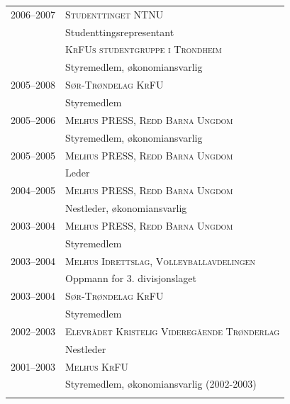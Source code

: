 \documentclass[a4paper,10pt]{article}
\begin{document}
\begin{longtable}{r|p{11cm}}

\textsc{2006--2007} & \textsc{Studenttinget NTNU} \\
& \footnotesize{ Studenttingsrepresentant }\\

\end{longtable}
\end{document}
